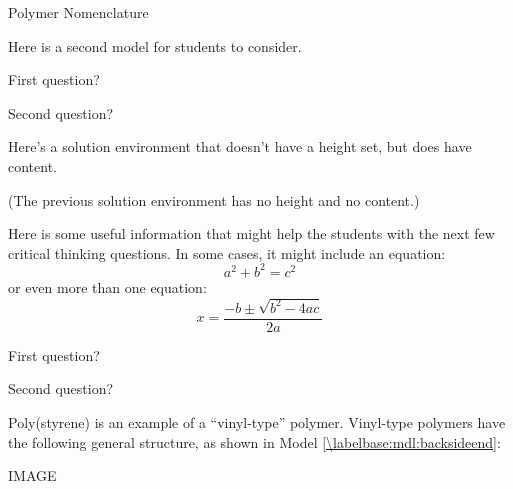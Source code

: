 \begin{activity}{Polymer Nomenclature}
\begin{model}[Isomerism]
	Here is a second model for students to consider.

\end{model}

\begin{ctqs}

	\question First question?
	
		\begin{solution}
		\end{solution}
	
	\question Second question?
	
		\begin{solution}
		
			Here's a solution environment that doesn't have a height set, but does have content.
			
			(The previous solution environment has no height and no content.)		
		
		\end{solution}
\end{ctqs}

		
\begin{infobox}
	Here is some useful information that might help the students with the next few critical thinking questions.
	In some cases, it might include an equation:
	\begin{equation*}
		a^2 + b^2 = c^2
	\end{equation*}
	or even more than one equation:
	\begin{equation*}
		x=\frac{-b \pm \sqrt{b^2-4ac}}{2a}
	\end{equation*}
\end{infobox}

\begin{ctqs}

	\question First question?
		\begin{solution}[1in]
		\end{solution}
	
	\question Second question?
		\begin{solution}[1in]
		\end{solution}
\end{ctqs}



\begin{exercises}

	\exercise Poly(styrene) is an example of a ``vinyl-type'' polymer.  Vinyl-type polymers have the following general structure, as shown in Model \ref{\labelbase:mdl:backsideend}:
	
		IMAGE
		

\end{exercises}
\end{activity}
